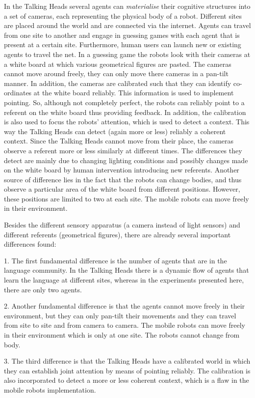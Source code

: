 In the Talking Heads several agents can {\em materialise} their cognitive structures into a set of cameras, each representing the physical body of a robot. Different sites are placed around the world and are connected via the internet. Agents can travel from one site to another and engage in guessing games with each agent that is present at a certain site. Furthermore, human users can launch new or existing agents to travel the net. In a guessing game the robots look with their cameras at a white board at which various geometrical figures are pasted. The cameras cannot move around freely, they can only move there cameras in a pan-tilt manner. In addition, the cameras are calibrated such that they can identify co-ordinates at the white board reliably. This information is used to implement pointing. So, although not completely perfect, the robots can reliably point to a referent on the white board thus providing feedback. In addition, the calibration is also used to focus the robots' attention, which is used to detect a context. This way the Talking Heads can detect (again more or less) reliably a coherent context. Since the Talking Heads cannot move from their place, the cameras observe a referent more or less similarly at different times. The differences they detect are mainly due to changing lighting conditions and possibly changes made on the white board by human intervention introducing new referents. Another source of difference lies in the fact that the robots can change bodies, and thus observe a particular area of the white board from different positions. However, these positions are limited to two at each site. The mobile robots can move freely in their environment.

Besides the different sensory apparatus (a camera instead of light sensors) and different referents (geometrical figures), there are already several important differences found:

\begin{description}
\item 1. The first fundamental difference is the number of agents that are in the language community. In the Talking Heads there is a dynamic flow of agents that learn the language at different sites, whereas in the experiments presented here, there are only two agents. 
\item 2. Another fundamental difference is that the agents cannot move freely in their environment, but they can only pan-tilt their movements and they can travel from site to site and from camera to camera. The mobile robots can move freely in their environment which is only at one site. The robots cannot change from body. 
\item 3. The third difference is that the Talking Heads have a calibrated world in which they can establish joint attention by means of pointing reliably. The calibration is also incorporated to detect a more or less coherent context, which is a flaw in the mobile robots implementation.
\end{description}

